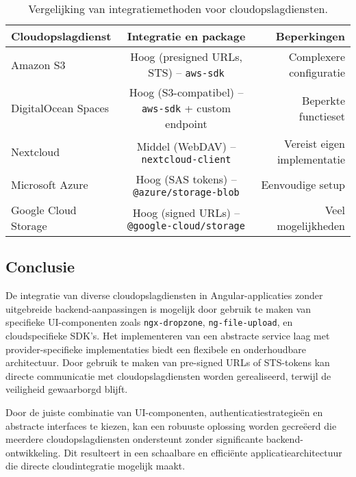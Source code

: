 \begin{table}
    \centering
    \footnotesize
    \begin{tabular}{lcr}
      \toprule
      \textbf{Cloudopslagdienst} & \textbf{Integratie en package} & \textbf{Beperkingen} \\
      \midrule
      Amazon S3 & Hoog (presigned URLs, STS) – \texttt{aws-sdk} & Complexere configuratie \\
      DigitalOcean Spaces & Hoog (S3-compatibel) – \texttt{aws-sdk} + custom endpoint & Beperkte functieset \\
      Nextcloud & Middel (WebDAV) – \texttt{nextcloud-client} & Vereist eigen implementatie \\
      Microsoft Azure & Hoog (SAS tokens) – \texttt{@azure/storage-blob} & Eenvoudige setup \\
      Google Cloud Storage & Hoog (signed URLs) – \texttt{@google-cloud/storage} & Veel mogelijkheden \\
      \bottomrule
    \end{tabular}
    \caption[Vergelijking cloudintegraties]{\label{tab:cloud-vergelijking}Vergelijking van integratiemethoden voor cloudopslagdiensten.}
 \end{table}

\subsection{Conclusie}

De integratie van diverse cloudopslagdiensten in Angular-applicaties zonder uitgebreide backend-aanpassingen is mogelijk door gebruik te maken van specifieke UI-componenten zoals \texttt{ngx-dropzone}, \texttt{ng-file-upload}, en cloudspecifieke SDK's. Het implementeren van een abstracte service laag met provider-specifieke implementaties biedt een flexibele en onderhoudbare architectuur. Door gebruik te maken van pre-signed URLs of STS-tokens kan directe communicatie met cloudopslagdiensten worden gerealiseerd, terwijl de veiligheid gewaarborgd blijft.

Door de juiste combinatie van UI-componenten, authenticatiestrategieën en abstracte interfaces te kiezen, kan een robuuste oplossing worden gecreëerd die meerdere cloudopslagdiensten ondersteunt zonder significante backend-ontwikkeling. Dit resulteert in een schaalbare en efficiënte applicatiearchitectuur die directe cloudintegratie mogelijk maakt.
